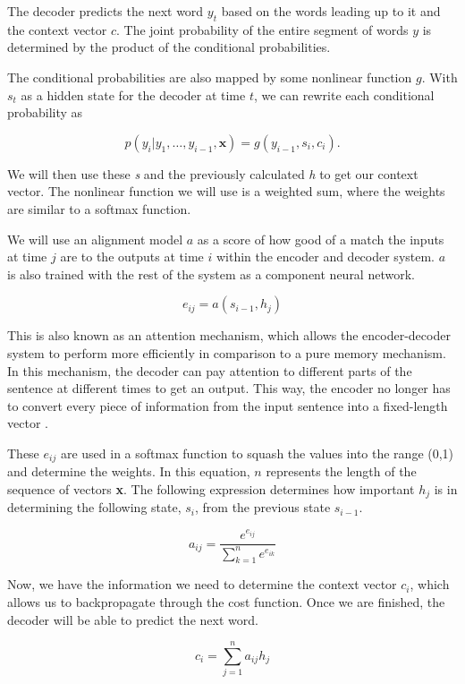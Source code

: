 \documentclass[11pt,a4paper]{scrartcl}
\theoremstyle{definition}
\begin{document}
The decoder predicts the next word $y_t$ based on the words leading up to it and the context vector $c$. The joint probability of the entire segment of words $y$ is determined by the product of the conditional probabilities. \newline

The conditional probabilities are also mapped by some nonlinear function $g$. With $s_t$ as a hidden state for the decoder at time $t$, we can rewrite each conditional probability as

\[p(y_i | y_1,\dots,y_{i-1}, \textbf{x}) = g(y_{i-1},s_i,c_i).\]

We will then use these \textit{s} and the previously calculated \textit{h} to get our context vector. The nonlinear function we will use is a weighted sum, where the weights are similar to a softmax function. \newline

We will use an alignment model $a$ as a score of how good of a match the inputs at time $j$ are to the outputs at time $i$ within the encoder and decoder system. $a$ is also trained with the rest of the system as a component neural network.

\[e_{ij} = a(s_{i-1},h_j)\]

This is also known as an attention mechanism, which allows the encoder-decoder system to perform more efficiently in comparison to a pure memory mechanism. In this mechanism, the decoder can pay attention to different parts of the sentence at different times to get an output. This way, the encoder no longer has to convert every piece of information from the input sentence into a fixed-length vector \cite{Britz}. \newline

These $e_{ij}$ are used in a softmax function to squash the values into the range (0,1) and determine the weights. In this equation, $n$ represents the length of the sequence of vectors \textbf{x}. The following expression determines how important $h_j$ is in determining the following state, $s_i$, from the previous state $s_{i-1}$. \newline

\[a_{ij} = \frac{e^{e_{ij}}}{\sum_{k=1}^{n}e^{e_{ik}}}\]

Now, we have the information we need to determine the context vector $c_i$, which allows us to backpropagate through the cost function. Once we are finished, the decoder will be able to predict the next word.

\[c_i = \sum_{j=1}^na_{ij}h_j\]
\end{document}
